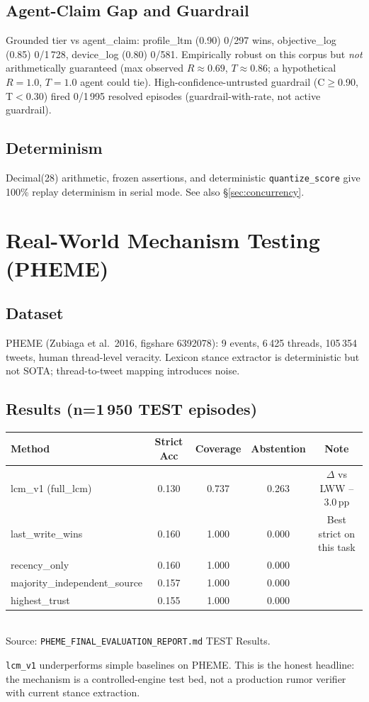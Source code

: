 \documentclass[12pt,a4paper]{article}
\begin{document}
\subsection{Agent-Claim Gap and Guardrail}
Grounded tier vs agent\_claim: profile\_ltm (0.90) 0/297 wins, objective\_log (0.85) 0/1\,728, device\_log (0.80) 0/581. Empirically robust on this corpus but \emph{not} arithmetically guaranteed (max observed $R\approx0.69$, $T\approx0.86$; a hypothetical $R=1.0$, $T=1.0$ agent could tie). High-confidence-untrusted guardrail (C$\ge$0.90, T$<$0.30) fired 0/1\,995 resolved episodes (guardrail-with-rate, not active guardrail).

\subsection{Determinism}
Decimal(28) arithmetic, frozen assertions, and deterministic \texttt{quantize\_score} give 100\% replay determinism in serial mode. See also \S\ref{sec:concurrency}.

\section{Real-World Mechanism Testing (PHEME)}

\subsection{Dataset}
PHEME (Zubiaga et al.\ 2016, figshare 6392078): 9 events, 6\,425 threads, 105\,354 tweets, human thread-level veracity. Lexicon stance extractor is deterministic but not SOTA; thread-to-tweet mapping introduces noise.

\subsection{Results (n=1\,950 TEST episodes)}
\begin{table}[H]
\centering\small
\begin{tabular}{lcccc}
\toprule
Method & Strict Acc & Coverage & Abstention & Note \\
\midrule
lcm\_v1 (full\_lcm) & 0.130 & 0.737 & 0.263 & $\Delta$ vs LWW --3.0\,pp \\
last\_write\_wins & 0.160 & 1.000 & 0.000 & Best strict on this task \\
recency\_only & 0.160 & 1.000 & 0.000 &  \\
majority\_independent\_source & 0.157 & 1.000 & 0.000 &  \\
highest\_trust & 0.155 & 1.000 & 0.000 &  \\
\bottomrule
\end{tabular}
\\Source: \texttt{PHEME\_FINAL\_EVALUATION\_REPORT.md} TEST Results.
\end{table}
\texttt{lcm\_v1} underperforms simple baselines on PHEME. This is the honest headline: the mechanism is a controlled-engine test bed, not a production rumor verifier with current stance extraction.
\end{document}

